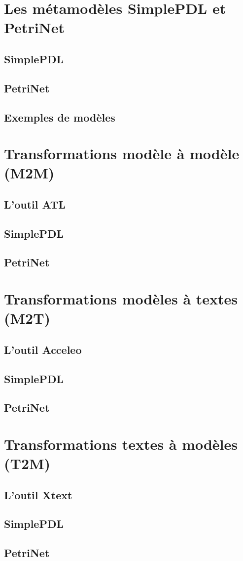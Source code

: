 \documentclass{rapport_gls}
\begin{document}


\newpage

\tableofcontents

\newpage

\chapter{Les métamodèles SimplePDL et PetriNet}
%
\section{SimplePDL}
\section{PetriNet}
\section{Exemples de modèles}

\chapter{Transformations modèle à modèle (M2M)}
\section{L'outil ATL}
\section{SimplePDL}
\section{PetriNet}

\chapter{Transformations modèles à textes (M2T)}
\section{L'outil Acceleo}
\section{SimplePDL}
\section{PetriNet}

\chapter{Transformations textes à modèles (T2M)}
\section{L'outil Xtext}
\section{SimplePDL}
\section{PetriNet}
\end{document}
